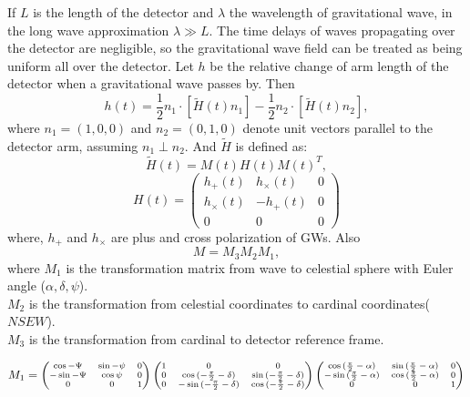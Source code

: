 \documentclass{ttuthes2007}
\begin{document}
If $L$ is the length of the detector and $\lambda$ the wavelength of gravitational
wave, in the long wave approximation $\lambda \gg L$. The time delays of
waves propagating over the detector are negligible, so the
gravitational wave field can be treated as being uniform all over the detector.
Let $h$ be the relative change of arm length of the detector when a gravitational wave
passes by. Then
\begin{equation}
h(t) = \frac{1}{2} n_1\cdot[\tilde{H}(t)n_1] - \frac{1}{2} n_2\cdot [\tilde{H}(t)n_2],
\end{equation}
where $n_1=(1,0,0)$ and $n_2=(0,1,0)$ denote unit vectors parallel to the
detector arm, assuming $n_1 \perp n_2$. And $\tilde{H}$ is defined as:
\begin{equation}
\tilde{H}(t) = M(t)H(t)M(t)^T,
\end{equation}
\begin{equation*}
H(t)=
\begin{pmatrix}
h_+(t) & h_\times(t) & 0\\
h_\times(t) & -h_+(t) & 0\\
0 & 0 & 0
\end{pmatrix}
\end{equation*}
where, $h_+$ and $h_\times$ are plus and cross polarization of \acp{GW}. Also
\begin{equation}
M= M_3 M_2 M_1,
\end{equation}
where
$M_1$ is the transformation matrix from wave to celestial sphere with
Euler angle ($\alpha,\delta,\psi$).\\
$M_2$ is the transformation from celestial coordinates to cardinal
coordinates($NSEW$).\\
$M_3$ is the transformation from cardinal to detector reference frame.

\begin{equation}
\scriptsize
M_1=
\begin{pmatrix}
\cos{-\Psi} & \sin{-\psi}& 0\\
-\sin{-\Psi} & \cos{\psi}& 0\\
0 & 0 & 1
\end{pmatrix}
\begin{pmatrix}
1 & 0 & 0\\
0 & \cos{(-\frac{\pi}{2}-\delta)} & \sin{(-\frac{\pi}{2}-\delta)}\\
0 & -\sin{(-\frac{\pi}{2}-\delta)} & \cos{(-\frac{\pi}{2}-\delta)}
\end{pmatrix}
\begin{pmatrix}
\cos{(\frac{\pi}{2}-\alpha)} & \sin{(\frac{\pi}{2}-\alpha)} & 0\\
-\sin{(\frac{\pi}{2}-\alpha)} & \cos{(\frac{\pi}{2}-\alpha)} & 0\\
0 & 0 & 1 
\end{pmatrix}
\end{equation}
\end{document}
